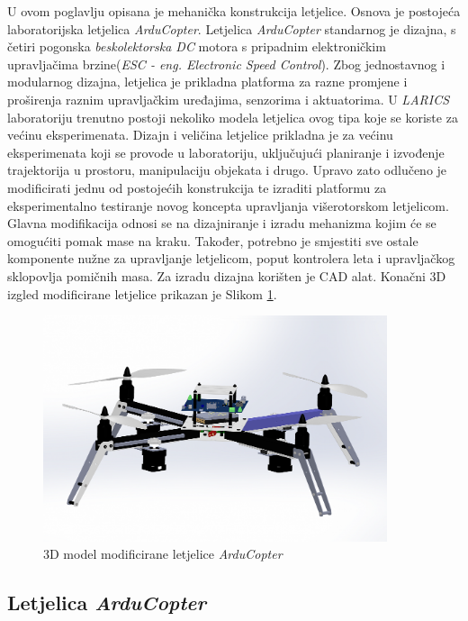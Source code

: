 \documentclass[11pt,a4paper]{article}
\begin{document}
U ovom poglavlju opisana je mehanička konstrukcija letjelice. Osnova je postojeća laboratorijska letjelica  \textit{ArduCopter}. Letjelica  \textit{ArduCopter} standarnog je dizajna, s četiri pogonska \textit{beskolektorska DC} motora s pripadnim  elektroničkim upravljačima brzine(\textit{ESC - eng. Electronic Speed Control}). Zbog jednostavnog i modularnog dizajna, letjelica je prikladna platforma za razne promjene i proširenja raznim upravljačkim uređajima, senzorima i aktuatorima. U \textit{LARICS} laboratoriju trenutno postoji nekoliko modela letjelica ovog tipa koje se koriste za većinu eksperimenata. Dizajn i veličina letjelice prikladna je za većinu eksperimenata koji se provode u laboratoriju, uključujući planiranje i izvođenje trajektorija u prostoru, manipulaciju objekata i drugo. Upravo zato odlučeno je modificirati jednu od postojećih konstrukcija te izraditi platformu za eksperimentalno testiranje novog koncepta upravljanja višerotorskom letjelicom. Glavna modifikacija odnosi se na dizajniranje i izradu mehanizma kojim će se omogućiti pomak mase na kraku. Također, potrebno je smjestiti sve ostale komponente nužne za upravljanje letjelicom, poput kontrolera leta i upravljačkog sklopovlja pomičnih masa. Za izradu dizajna korišten je CAD alat. Konačni 3D izgled modificirane letjelice prikazan je Slikom \ref{Slika:3D_drone_final}.

\begin{figure}[H]
	\centering
	\includegraphics[width=0.9\textwidth]{figures/arducopter_with_PCB.png}
	\caption{3D model modificirane letjelice \textit{ArduCopter}}
	\label{Slika:3D_drone_final}
\end{figure}

\subsection{Letjelica  \textit{ArduCopter}}
\end{document}
